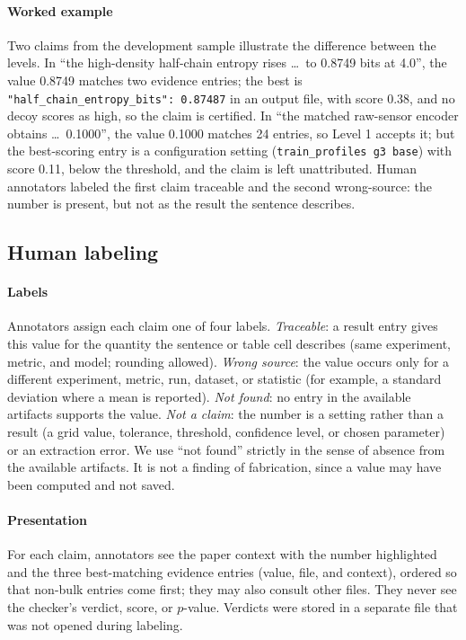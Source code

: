 \documentclass[preprint,12pt,authoryear]{elsarticle}
\begin{document}
\paragraph{Worked example} Two claims from the development sample illustrate the difference between the levels. In ``the high-density half-chain entropy rises \ldots\ to 0.8749 bits at 4.0'', the value 0.8749 matches two evidence entries; the best is \texttt{"half\_chain\_entropy\_bits": 0.87487} in an output file, with score 0.38, and no decoy scores as high, so the claim is certified. In ``the matched raw-sensor encoder obtains \ldots\ 0.1000'', the value 0.1000 matches 24 entries, so Level 1 accepts it; but the best-scoring entry is a configuration setting (\texttt{train\_profiles g3 base}) with score 0.11, below the threshold, and the claim is left unattributed. Human annotators labeled the first claim traceable and the second wrong-source: the number is present, but not as the result the sentence describes.

\subsection{Human labeling}\label{sec:labels}

\paragraph{Labels} Annotators assign each claim one of four labels. \emph{Traceable}: a result entry gives this value for the quantity the sentence or table cell describes (same experiment, metric, and model; rounding allowed). \emph{Wrong source}: the value occurs only for a different experiment, metric, run, dataset, or statistic (for example, a standard deviation where a mean is reported). \emph{Not found}: no entry in the available artifacts supports the value. \emph{Not a claim}: the number is a setting rather than a result (a grid value, tolerance, threshold, confidence level, or chosen parameter) or an extraction error. We use ``not found'' strictly in the sense of absence from the available artifacts. It is not a finding of fabrication, since a value may have been computed and not saved.

\paragraph{Presentation} For each claim, annotators see the paper context with the number highlighted and the three best-matching evidence entries (value, file, and context), ordered so that non-bulk entries come first; they may also consult other files. They never see the checker's verdict, score, or $p$-value. Verdicts were stored in a separate file that was not opened during labeling.
\end{document}
